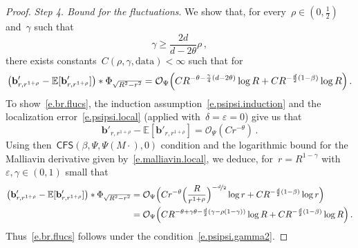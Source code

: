 \documentclass[11pt,twoside]{article} %
\numberwithin{equation}{section}
\theoremstyle{definition}
\newcommand{\eps}{\varepsilon}
\renewcommand{\b}{\ensuremath{\mathbf{b}}}
\newcommand{\ep}{\eps}
\newcommand{\E}{\mathbb{E}}
\renewcommand{\O}{\mathcal{O}}
\newcommand{\data}{\mathrm{data}}
\newcommand{\CFS}{\mathsf{CFS}}
\begin{document}
\begin{proof}
\smallskip 

\emph{Step 4. Bound for the fluctuations}. We show that, for every~$\rho \in (0,\frac12)$ and~$\gamma$ such that 
\begin{equation} \label{e.psipsi.gamma2}
\gamma \geq \frac{2d}{d-2\theta} \rho \,,
\end{equation}
there exists constants~$C(\rho,\gamma,\data) < \infty$ such that for
\begin{equation}  \label{e.br.flucs}
\bigl( \b'_{r,r^{1+\rho}} - \E [ \b'_{r,r^{1+\rho}} ] \bigr) \ast \Phi_{\sqrt{R^2-r^2}} 
= 
 \O_{\Psi} \Bigl(  C R^{-\theta - \frac{\gamma}{4}(d- 2\theta)}  \log R  + C R^{-\frac d2(1-\beta) } \log R  \Bigr) 
\,.
\end{equation}
To show~\eqref{e.br.flucs}, the induction assumption~\eqref{e.psipsi.induction} and the localization error~\eqref{e.psipsi.local} (applied with~$\delta = \ep = 0$) give us that 
\begin{equation*}  
 \b'_{r,r^{1+\rho}} - \E [ \b'_{r,r^{1+\rho}} ]  
 =  
 \O_{\Psi} (C r^{- \theta})
 \,.
\end{equation*}
Using then~$\CFS(\beta,\Psi,\Psi(M \cdot),0)$ condition and the logarithmic bound for the Malliavin derivative given by~\eqref{e.malliavin.local}, we deduce, for~$r = R^{1-\gamma}$ with~$\ep,\gamma\in (0,1)$ small that
\begin{align*}  
\bigl( \b'_{r,r^{1+\rho}} - \E [ \b'_{r,r^{1+\rho}} ] \bigr) \ast \Phi_{\sqrt{R^2-r^2}}
 & = 
 \O_{\Psi} \Bigl( C r^{-\theta} \Bigl( \frac{R}{r^{1+\rho}} \Bigr)^{-\nicefrac d2} \log r + C  R^{-\frac d2(1-\beta) } \log r  \Bigr)
  \\ & 
 =
 \O_{\Psi} \Bigl(  C R^{-\theta + \gamma \theta - \frac{d}{2} (\gamma - \rho(1-\gamma) ) }  \log R  + C R^{-\frac d2(1-\beta) } \log R  \Bigr) 
 \,.
\end{align*}
Thus~\eqref{e.br.flucs} follows under the condition~\eqref{e.psipsi.gamma2}.




\smallskip 


\end{proof}
\end{document}
